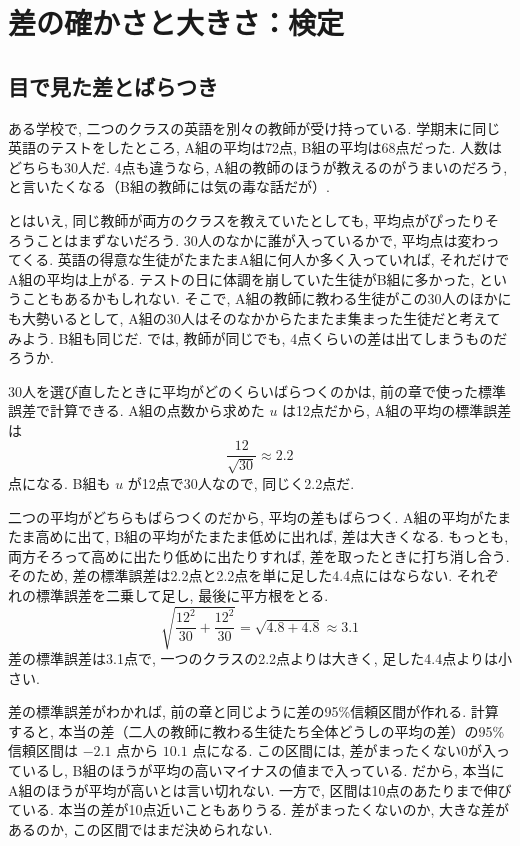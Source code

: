 \section{差の確かさと大きさ：検定}

  \subsection{目で見た差とばらつき}

    ある学校で, 二つのクラスの英語を別々の教師が受け持っている.
    学期末に同じ英語のテストをしたところ, A組の平均は72点, B組の平均は68点だった.
    人数はどちらも30人だ.
    4点も違うなら, A組の教師のほうが教えるのがうまいのだろう, と言いたくなる（B組の教師には気の毒な話だが）.

    とはいえ, 同じ教師が両方のクラスを教えていたとしても, 平均点がぴったりそろうことはまずないだろう.
    30人のなかに誰が入っているかで, 平均点は変わってくる.
    英語の得意な生徒がたまたまA組に何人か多く入っていれば, それだけでA組の平均は上がる.
    テストの日に体調を崩していた生徒がB組に多かった, ということもあるかもしれない.
    そこで, A組の教師に教わる生徒がこの30人のほかにも大勢いるとして, A組の30人はそのなかからたまたま集まった生徒だと考えてみよう.
    B組も同じだ.
    では, 教師が同じでも, 4点くらいの差は出てしまうものだろうか.

    30人を選び直したときに平均がどのくらいばらつくのかは, 前の章で使った標準誤差で計算できる.
    A組の点数から求めた $u$ は12点だから, A組の平均の標準誤差は
    \[
      \frac{12}{\sqrt{30}} \approx 2.2
    \]
    点になる.
    B組も $u$ が12点で30人なので, 同じく2.2点だ.

    二つの平均がどちらもばらつくのだから, 平均の差もばらつく.
    A組の平均がたまたま高めに出て, B組の平均がたまたま低めに出れば, 差は大きくなる.
    もっとも, 両方そろって高めに出たり低めに出たりすれば, 差を取ったときに打ち消し合う.
    そのため, 差の標準誤差は2.2点と2.2点を単に足した4.4点にはならない.
    それぞれの標準誤差を二乗して足し, 最後に平方根をとる.
    \[
      \sqrt{\frac{12^2}{30} + \frac{12^2}{30}} = \sqrt{4.8 + 4.8} \approx 3.1
    \]
    差の標準誤差は3.1点で, 一つのクラスの2.2点よりは大きく, 足した4.4点よりは小さい.

    差の標準誤差がわかれば, 前の章と同じように差の95\%信頼区間が作れる.
    計算すると, 本当の差（二人の教師に教わる生徒たち全体どうしの平均の差）の95\%信頼区間は $-2.1$ 点から $10.1$ 点になる.
    この区間には, 差がまったくない0が入っているし, B組のほうが平均の高いマイナスの値まで入っている.
    だから, 本当にA組のほうが平均が高いとは言い切れない.
    一方で, 区間は10点のあたりまで伸びている.
    本当の差が10点近いこともありうる.
    差がまったくないのか, 大きな差があるのか, この区間ではまだ決められない.

